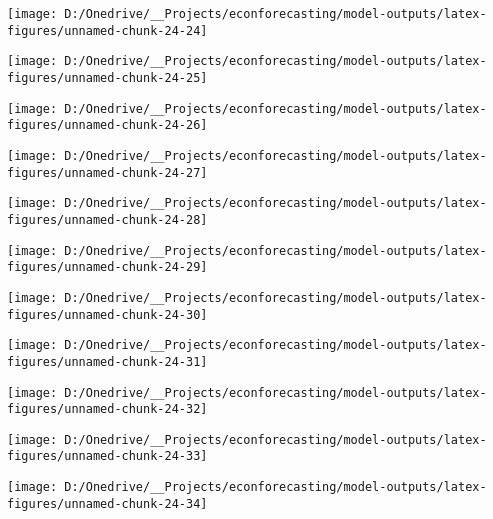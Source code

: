 \documentclass[11pt, letterpaper]{article}\usepackage[]{graphicx}\usepackage[]{color}
\begin{document}
{\centering \texttt{[image: D:/Onedrive/\_\_Projects/econforecasting/model-outputs/latex-figures/unnamed-chunk-24-24]} 

}




{\centering \texttt{[image: D:/Onedrive/\_\_Projects/econforecasting/model-outputs/latex-figures/unnamed-chunk-24-25]} 

}




{\centering \texttt{[image: D:/Onedrive/\_\_Projects/econforecasting/model-outputs/latex-figures/unnamed-chunk-24-26]} 

}




{\centering \texttt{[image: D:/Onedrive/\_\_Projects/econforecasting/model-outputs/latex-figures/unnamed-chunk-24-27]} 

}




{\centering \texttt{[image: D:/Onedrive/\_\_Projects/econforecasting/model-outputs/latex-figures/unnamed-chunk-24-28]} 

}




{\centering \texttt{[image: D:/Onedrive/\_\_Projects/econforecasting/model-outputs/latex-figures/unnamed-chunk-24-29]} 

}




{\centering \texttt{[image: D:/Onedrive/\_\_Projects/econforecasting/model-outputs/latex-figures/unnamed-chunk-24-30]} 

}




{\centering \texttt{[image: D:/Onedrive/\_\_Projects/econforecasting/model-outputs/latex-figures/unnamed-chunk-24-31]} 

}




{\centering \texttt{[image: D:/Onedrive/\_\_Projects/econforecasting/model-outputs/latex-figures/unnamed-chunk-24-32]} 

}




{\centering \texttt{[image: D:/Onedrive/\_\_Projects/econforecasting/model-outputs/latex-figures/unnamed-chunk-24-33]} 

}




{\centering \texttt{[image: D:/Onedrive/\_\_Projects/econforecasting/model-outputs/latex-figures/unnamed-chunk-24-34]} 

}
\end{document}

